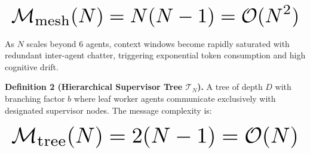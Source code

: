 \documentclass{article}
\begin{document}
\begin{equation}
\resizebox{\columnwidth}{!}{$\displaystyle
\begin{aligned}
\mathcal{M}_{\text{mesh}}(N) = N(N - 1) = \mathcal{O}(N^2)
\end{aligned}
$}
\end{equation}


























As $N$ scales beyond 6 agents, context windows become rapidly saturated with redundant inter-agent chatter, triggering exponential token consumption and high cognitive drift.

\textbf{Definition 2 (Hierarchical Supervisor Tree $\mathcal{T}_N$).} A tree of depth $D$ with branching factor $b$ where leaf worker agents communicate exclusively with designated supervisor nodes. The message complexity is:


























\begin{equation}
\resizebox{\columnwidth}{!}{$\displaystyle
\begin{aligned}
\mathcal{M}_{\text{tree}}(N) = 2(N - 1) = \mathcal{O}(N)
\end{aligned}
$}
\end{equation}
\end{document}
